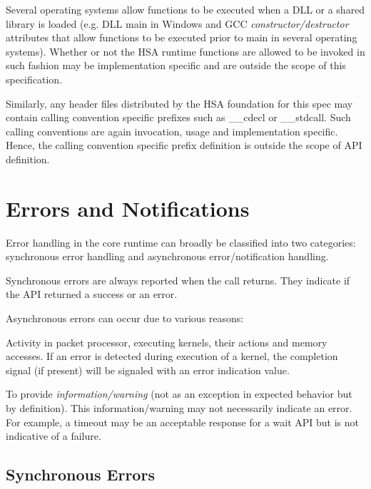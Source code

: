 \documentclass{book}
\newcommand{\emphld}[1]{\begin{DIFnomarkup} \emph{#1}
\end{DIFnomarkup}}
\newenvironment{DIFnomarkup}{}{}
\begin{document}
Several operating systems allow functions to be executed when a DLL
or a shared library is loaded (e.g. DLL main in Windows and GCC
\emph{constructor/destructor} attributes that allow functions to be
executed prior to main in several operating systems).
Whether or not the HSA runtime functions are allowed to be invoked
in such fashion may be implementation specific and are outside the
scope of this specification.

Similarly, any header files distributed by the HSA foundation for
this spec may contain calling convention specific prefixes such as
\_\_cdecl or \_\_stdcall. Such calling conventions are again invocation,
usage and implementation specific. Hence, the calling convention
specific prefix definition is outside the scope of API definition.

\begin{DIFnomarkup}
\hypertarget{error}{}\section{Errors and Notifications}
\label{error}
\end{DIFnomarkup}

Error handling in the core runtime can broadly be classified into
two categories: synchronous error handling and asynchronous
error/notification handling.

Synchronous errors are always reported when the call returns. They
indicate if the API returned a success or an error.

Asynchronous errors can occur due to various reasons:
\begin{inparaenum}[(i)]

\item Activity in packet processor, executing kernels, their actions
and memory accesses. If an error is detected during execution of a
kernel, the completion signal (if present) will be signaled with an
error indication value.

\item To provide \emphld{information/warning} (not as an exception
in expected behavior but by definition). This information/warning
may not necessarily indicate an error. For example, a timeout may be
an acceptable response for a wait API but is not indicative of a
failure.

\end{inparaenum}

\begin{DIFnomarkup}
\hypertarget{syncerror}{}\subsection{Synchronous Errors }\label{syncerror}
\end{DIFnomarkup}
\end{document}
